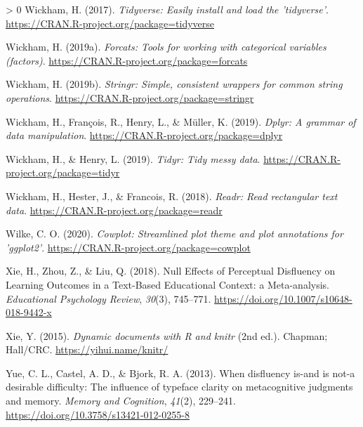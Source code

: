 \documentclass[
  english,
  jou]{apa7}
\newlength{\cslhangindent}
\newenvironment{CSLReferences}[3] %
 {%
  \setlength{\parindent}{0pt}
  \ifodd #1 \everypar{\setlength{\hangindent}{\cslhangindent}}\ignorespaces\fi
  \ifnum #2 > 0
  \setlength{\parskip}{#2\baselineskip}
  \fi
 }%
 {}
\begin{document}
\begin{CSLReferences}{1}{0}
\leavevmode\hypertarget{ref-R-tidyverse}{}%
Wickham, H. (2017). \emph{Tidyverse: Easily install and load the 'tidyverse'}. \url{https://CRAN.R-project.org/package=tidyverse}

\leavevmode\hypertarget{ref-R-forcats}{}%
Wickham, H. (2019a). \emph{Forcats: Tools for working with categorical variables (factors)}. \url{https://CRAN.R-project.org/package=forcats}

\leavevmode\hypertarget{ref-R-stringr}{}%
Wickham, H. (2019b). \emph{Stringr: Simple, consistent wrappers for common string operations}. \url{https://CRAN.R-project.org/package=stringr}

\leavevmode\hypertarget{ref-R-dplyr}{}%
Wickham, H., François, R., Henry, L., \& Müller, K. (2019). \emph{Dplyr: A grammar of data manipulation}. \url{https://CRAN.R-project.org/package=dplyr}

\leavevmode\hypertarget{ref-R-tidyr}{}%
Wickham, H., \& Henry, L. (2019). \emph{Tidyr: Tidy messy data}. \url{https://CRAN.R-project.org/package=tidyr}

\leavevmode\hypertarget{ref-R-readr}{}%
Wickham, H., Hester, J., \& Francois, R. (2018). \emph{Readr: Read rectangular text data}. \url{https://CRAN.R-project.org/package=readr}

\leavevmode\hypertarget{ref-R-cowplot}{}%
Wilke, C. O. (2020). \emph{Cowplot: Streamlined plot theme and plot annotations for 'ggplot2'}. \url{https://CRAN.R-project.org/package=cowplot}

\leavevmode\hypertarget{ref-Xie2018}{}%
Xie, H., Zhou, Z., \& Liu, Q. (2018). {Null Effects of Perceptual Disfluency on Learning Outcomes in a Text-Based Educational Context: a Meta-analysis}. \emph{Educational Psychology Review}, \emph{30}(3), 745--771. \url{https://doi.org/10.1007/s10648-018-9442-x}

\leavevmode\hypertarget{ref-R-knitr}{}%
Xie, Y. (2015). \emph{Dynamic documents with {R} and knitr} (2nd ed.). Chapman; Hall/CRC. \url{https://yihui.name/knitr/}

\leavevmode\hypertarget{ref-Yue2013}{}%
Yue, C. L., Castel, A. D., \& Bjork, R. A. (2013). {When disfluency is-and is not-a desirable difficulty: The influence of typeface clarity on metacognitive judgments and memory}. \emph{Memory and Cognition}, \emph{41}(2), 229--241. \url{https://doi.org/10.3758/s13421-012-0255-8}

\end{CSLReferences}

\endgroup
\end{document}
